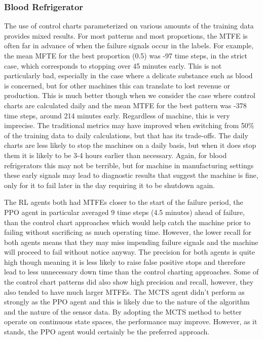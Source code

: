 \documentclass[12pt]{article}
\begin{document}
\subsubsection{Blood Refrigerator}

The use of control charts parameterized on various amounts of the training data provides mixed results. For most patterns and most proportions, the MTFE is often far in advance of when the failure signals occur in the labels.
For example, the mean MFTE for the best proportion (0.5) was -97 time steps, in the strict case, which corresponds to stopping over 45 minutes early. This is not particularly bad, especially in the case where a delicate substance
such as blood is concerned, but for other machines this can translate to lost revenue or production. This is much better though when we consider the case where control charts are calculated daily and the mean MTFE for the best pattern
was -378 time steps, around 214 minutes early. Regardless of machine, this is very imprecise. The traditional metrics may have improved when switching from 50\% of the training data to daily calculations, but that has its trade-offs. The
daily charts are less likely to stop the machines on a daily basis, but when it does stop them it is likely to be 3-4 hours earlier than necessary. Again, for blood refrigerators this may not be terrible, but for machine in manufacturing
settings these early signals may lead to diagnostic results that suggest the machine is fine, only for it to fail later in the day requiring it to be shutdown again.

The RL agents both had MTFEs closer to the start of the failure period, the PPO agent in particular averaged 9 time steps (4.5 minutes) ahead of failure, than the control chart approaches which would help catch the machine prior to failing 
without sacrificing as much operating time. However, the lower recall for both agents
means that they may miss impending failure signals and the machine will proceed to fail without notice anyway. The precision for both agents is quite high though meaning it is less likely to raise false positive stops and therefore lead to less
unnecessary down time than the control charting approaches. Some of the control chart patterns did also show high precision and recall, however, they also tended to have much larger MTFEs. The MCTS agent didn't perform as strongly as the PPO agent
and this is likely due to the nature of the algorithm and the nature of the sensor data. By adopting the MCTS method to better operate on continuous state spaces, the performance may improve. However, as it stands, the PPO agent would certainly be
the preferred approach.
\end{document}
